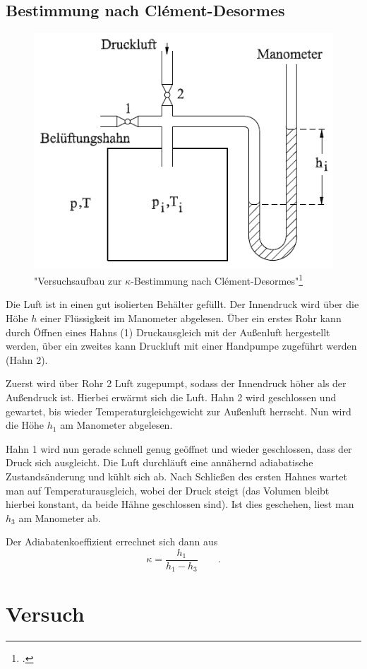 \subsection{Bestimmung nach Clément-Desormes}
\begin{figure}[h]
  \centering
  \includegraphics[width=.7\textwidth]{res/clement}
  \caption{"Versuchsaufbau zur $\kappa$-Bestimmung nach Clément-Desormes"\footcite{anleitung-ss2015}}
  \label{fig:clement}
\end{figure}
Die Luft ist in einen gut isolierten Behälter gefüllt. Der Innendruck wird über die Höhe $h$ einer Flüssigkeit im Manometer abgelesen. Über ein erstes Rohr kann durch Öffnen eines Hahns (1) Druckausgleich mit der Außenluft hergestellt werden, über ein zweites kann Druckluft mit einer Handpumpe zugeführt werden (Hahn 2).

Zuerst wird über Rohr 2 Luft zugepumpt, sodass der Innendruck höher als der Außendruck ist. Hierbei erwärmt sich die Luft. Hahn 2 wird geschlossen und gewartet, bis wieder Temperaturgleichgewicht zur Außenluft herrscht. Nun wird die Höhe $h_1$ am Manometer abgelesen.

Hahn 1 wird nun gerade schnell genug geöffnet und wieder geschlossen, dass der Druck sich ausgleicht. Die Luft durchläuft eine annähernd adiabatische Zustandsänderung und kühlt sich ab. Nach Schließen des ersten Hahnes wartet man auf Temperaturausgleich, wobei der Druck steigt (das Volumen bleibt hierbei konstant, da beide Hähne geschlossen sind). Ist dies geschehen, liest man $h_3$ am Manometer ab.

Der Adiabatenkoeffizient errechnet sich dann aus
\begin{equation}
	\kappa=\frac{h_1}{h_1-h_3} \qquad .
\label{eq:clement}
\end{equation}

\section{Versuch}
